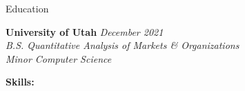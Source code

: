 \documentclass{resume/resume}
\begin{document}
\begin{rSection}{Education}

{\bf University of Utah} \hfill {\em December 2021}
\vspace{2pt}
\emph{
    \\ B.S. Quantitative Analysis of Markets \& Organizations
    \\ Minor Computer Science
}

%
%
%
%
%
%
%   
%
%
%
%

%
%
{\bf Skills:}
\vspace{-1.83em}


\end{rSection}
\end{document}
